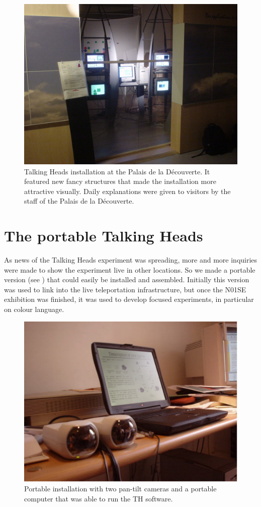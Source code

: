\begin{figure}[htbp]
  \centerline{\includegraphics[width=\textwidth]{chap9/figs/th4.jpg}}
\caption{\label{fig:palais}Talking Heads installation at the Palais de la D\'{e}couverte. It featured new fancy structures that 
made the installation more attractive visually. Daily explanations were given to visitors 
by the staff of the Palais de la D\'{e}couverte.} 
\end{figure}

\section{The portable Talking Heads} 

As news of the Talking Heads experiment was spreading, more and more inquiries were made to 
show the experiment live in other locations. So we made a portable version (see ) that could easily 
be installed and assembled. Initially this version was used to link into the live 
teleportation infrastructure, but once the N01SE exhibition was finished, it was used to develop focused 
experiments, in particular on colour language. 

\begin{figure}[htbp]
  \centerline{\includegraphics[width=.60\textwidth]{chap9/figs/road.pdf}}
\caption{\label{fig:road}Portable installation with two pan-tilt cameras and a portable computer that was able to run the TH software.}
\end{figure}

